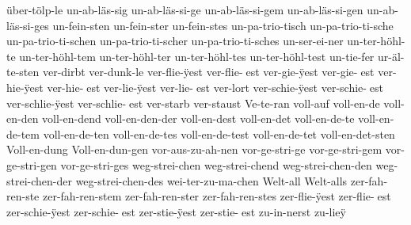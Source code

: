 {  ^^fcber-t^^f6lp-le %
  un-ab-l^^e4s-sig %
  un-ab-l^^e4s-si-ge %
  un-ab-l^^e4s-si-gem %
  un-ab-l^^e4s-si-gen %
  un-ab-l^^e4s-si-ges %
  un-fein-sten %
  un-fein-ster %
  un-fein-stes %
  un-pa-trio-tisch %
  un-pa-trio-ti-sche %
  un-pa-trio-ti-schen %
  un-pa-trio-ti-scher %
  un-pa-trio-ti-sches %
  un-ser-ei-ner %
  un-ter-h^^f6hl-te %
  un-ter-h^^f6hl-tem %
  un-ter-h^^f6hl-ter %
  un-ter-h^^f6hl-tes %
  un-ter-h^^f6hl-test %
  un-tie-fer %
  ur-^^e4l-te-sten %
  ver-dirbt %
  ver-dunk-le %
  ver-flie-^^ffest %
  ver-flie-^^Yest
  ver-gie-^^ffest %
  ver-gie-^^Yest
  ver-hie-^^ffest %
  ver-hie-^^Yest
  ver-lie-^^ffest %
  ver-lie-^^Yest
  ver-lort %
  ver-schie-^^ffest %
  ver-schie-^^Yest
  ver-schlie-^^ffest %
  ver-schlie-^^Yest
  ver-starb %
  ver-staust %
  Ve-te-ran %
  voll-auf %
  voll-en-de %
  voll-en-den %
  voll-en-dend %
  voll-en-den-der %
  voll-en-dest %
  voll-en-det %
  voll-en-de-te %
  voll-en-de-tem %
  voll-en-de-ten %
  voll-en-de-tes %
  voll-en-de-test %
  voll-en-de-tet %
  voll-en-det-sten %
  Voll-en-dung %
  Voll-en-dun-gen %
  vor-aus-zu-ah-nen %
  vor-ge-stri-ge %
  vor-ge-stri-gem %
  vor-ge-stri-gen %
  vor-ge-stri-ges %
  weg-strei-chen %
  weg-strei-chend %
  weg-strei-chen-den %
  weg-strei-chen-der %
  weg-strei-chen-des %
  wei-ter-zu-ma-chen %
  Welt-all %
  Welt-alls %
  zer-fah-ren-ste %
  zer-fah-ren-stem %
  zer-fah-ren-ster %
  zer-fah-ren-stes %
  zer-flie-^^ffest %
  zer-flie-^^Yest
  zer-schie-^^ffest %
  zer-schie-^^Yest
  zer-stie-^^ffest %
  zer-stie-^^Yest
  zu-in-nerst %
  zu-lie^^ff %
}
